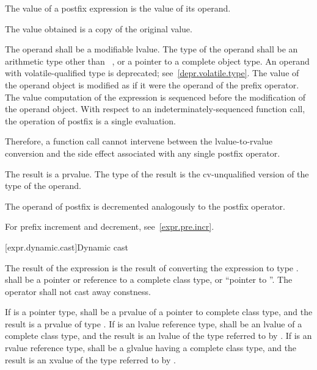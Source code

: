 \pnum
{}%
%
%
%
The value of a postfix \tcode{++} expression is the value of its
operand.
\begin{note}
The value obtained is a copy of the original value.
\end{note}
The operand shall be a modifiable lvalue. The type of the operand shall
be an arithmetic type other than \cv{}~,
or a pointer to a complete object type.
An operand with volatile-qualified type is deprecated;
see~\ref{depr.volatile.type}.
The value of the operand object is modified
as if it were the operand of the prefix \tcode{++} operator.
The
%
value computation of the \tcode{++} expression is sequenced before the
modification of the operand object. With respect to an
indeterminately-sequenced function call, the operation of postfix
\tcode{++} is
a single evaluation.
\begin{note}
Therefore, a function call cannot intervene between the
lvalue-to-rvalue conversion and the side effect associated with any
single postfix \tcode{++} operator.
\end{note}
The result is a prvalue. The type of the result is the cv-unqualified
version of the type of the operand.

\pnum
{}%
%
%
%
The operand of postfix \tcode{--} is decremented analogously to the
postfix \tcode{++} operator.
\begin{note}
For prefix increment and decrement, see~\ref{expr.pre.incr}.
\end{note}

[expr.dynamic.cast]{Dynamic cast}

\pnum
{}%
%
The result of the expression  is the result of
converting the expression  to type .
%
 shall be a pointer or reference to a complete class type, or
``pointer to \cv{} ''. The  operator shall not cast
away constness.

\pnum
If  is a pointer type,  shall be a prvalue of a
pointer to complete class type, and the result is a prvalue of type
. If  is an lvalue reference type,  shall be
an lvalue of a complete class type, and the result is an lvalue of the
type referred to by . If  is an rvalue reference type,
 shall be a glvalue having a complete class type, and the
result is an xvalue of the type referred to by .

